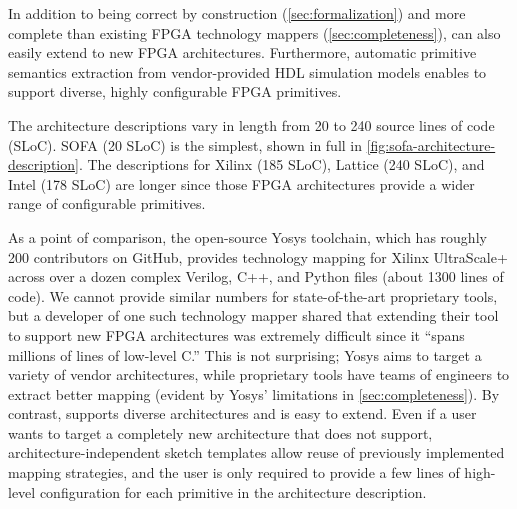 In addition to being
  correct by construction (\cref{sec:formalization}) and
  more complete 
  than existing FPGA technology mappers (\cref{sec:completeness}),
  \lr can also easily extend to new FPGA architectures.
Furthermore, automatic primitive semantics extraction 
  from vendor-provided HDL simulation models
  enables \lr to support diverse, highly configurable
  FPGA primitives.


The architecture descriptions
    vary in length from 20 to 240
    source lines of code (SLoC).
%
SOFA (20 SLoC) is the simplest, shown in full
  in \cref{fig:sofa-architecture-description}.
The descriptions for Xilinx (185 SLoC), 
  Lattice (240 SLoC), and Intel (178 SLoC)
  are longer since those
  FPGA architectures provide a
  wider range of configurable primitives.

As a point of comparison,
  the open-source Yosys toolchain,
  which has roughly 200 contributors on GitHub,
  provides technology mapping
  for Xilinx UltraScale+
  across over a dozen complex
  Verilog, C++, and Python files (about 1300
  lines of code).
We cannot provide similar numbers
  for state-of-the-art proprietary tools,
  but a developer
  of one such technology mapper
  shared that extending their tool to
  support new FPGA architectures
  was extremely difficult since it 
  ``spans millions of lines of low-level C.''
This is not surprising; Yosys aims to
  target a variety of vendor architectures, 
  while proprietary tools have teams of
  engineers to extract better mapping 
  (evident by Yosys' limitations
  in \cref{sec:completeness}).
By contrast,
  \lr supports
  diverse architectures and
  is easy to extend.
Even if a user
  wants to target a completely
  new architecture that
  \lr does not support,
  architecture-independent
  sketch templates allow reuse
  of previously implemented mapping
  strategies, and the user is
  only required to provide
  a few lines of
  high-level configuration
  for each primitive in 
  the architecture description.
  
